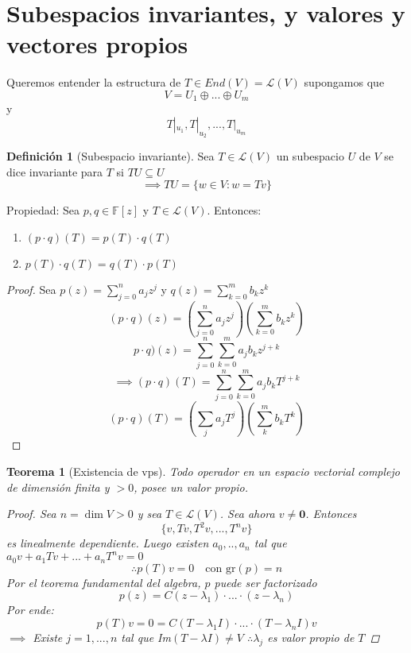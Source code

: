 \documentclass[11pt]{book}
\renewcommand{\vec}[1]{\mathbf{#1}}
\newcommand{\set}[1]{\mathbb{#1}}
\newtheorem{thm}{Teorema}[section]
\theoremstyle{definition}
\newtheorem{defn}{Definición}[section]
\begin{document}
\section{Subespacios invariantes, y valores y vectores propios}
Queremos entender la estructura de $T\in End(V)=\mathcal{L}(V)$ supongamos que
\[V=U_1\oplus...\oplus U_m\]
y
\[T|_{u_1},T|_{u_2},...,T|_{u_m}\]

\begin{defn}[Subespacio invariante]
	Sea $T\in\mathcal{L}(V)$ un subespacio $U$ de $V$ se dice invariante para $T$ si $TU\subseteq U$
	\[\implies TU=\{w\in V:w=Tv\}\]
\end{defn}
Propiedad: Sea $p,q\in\set{F}[z]$ y $T\in\mathcal{L}(V)$. Entonces:
\begin{enumerate}
	\item $(p\cdot q)(T)=p(T)\cdot q(T)$
	
	\item $p(T)\cdot q(T)=q(T)\cdot p(T)$
\end{enumerate}
\begin{proof}
	Sea $p(z)=\sum^n_{j=0}a_jz^j$ y $q(z)=\sum^m_{k=0}b_kz^k$
	\[(p\cdot q)(z)=\left(\sum^n_{j=0}a_jz^j\right)\left(\sum^m_{k=0}b_kz^k\right)\]
	\[p\cdot q)(z)=\sum^n_{j=0}\sum^m_{k=0}a_jb_kz^{j+k}\]
	\[\implies (p\cdot q)(T)=\sum^n_{j=0}\sum^m_{k=0}a_jb_kT^{j+k}\]
	\[(p\cdot q)(T)=(\sum_ja_jT^j)(\sum^m_kb_kT^k)\]
\end{proof}
\begin{thm}[Existencia de vps]
	Todo operador en un espacio vectorial complejo de dimensión finita y $>0$, posee un valor propio.
	\begin{proof}
		Sea $n=\dim V>0$ y sea $T\in\mathcal{L}(V)$. Sea ahora $v\neq\vec{0}$. Entonces
		\[\{v,Tv,T^2v,...,T^nv\}\]
		es linealmente dependiente. Luego existen $a_0,..,a_n$ tal que $a_0v+a_1Tv+...+a_nT^nv=0$
		\[\therefore p(T)v=0\quad\textrm{con gr$(p)=n$}\]
		Por el teorema fundamental del algebra, $p$ puede ser factorizado
		\[p(z)=C(z-\lambda_1)\cdot...\cdot(z-\lambda_n)\]
		Por ende:
		\[p(T)v=0=C(T-\lambda_1 I)\cdot...\cdot(T-\lambda_n I)v\]
		$\implies$ Existe $j=1,...,n$ tal que Im$(T-\lambda I)\neq V$
		$\therefore\lambda_j$ es valor propio de $T$
	\end{proof}
\end{thm}
\end{document}
